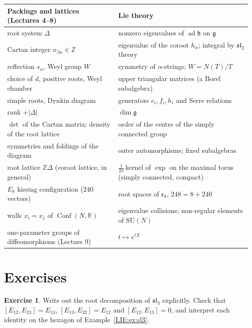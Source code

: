 \documentclass[11pt,openany]{book}
\theoremstyle{plain}
\theoremstyle{definition}
\newtheorem{exercise}[theorem]{Exercise}
\theoremstyle{remark}
\newcommand{\R}{\mathbb{R}}
\newcommand{\Z}{\mathbb{Z}}
\newcommand{\Conf}{\operatorname{Conf}}
\newcommand{\abs}[1]{\left\lvert #1 \right\rvert}
\begin{document}
\begin{center}
\renewcommand{\arraystretch}{1.25}
\begin{tabular}{p{}p{}}
\toprule
Packings and lattices (Lectures 4--8) & Lie theory\\
\midrule
root system $\Delta$ & nonzero eigenvalues of $\operatorname{ad}\mathfrak h$ on $\mathfrak g$\\
Cartan integer $n_{\beta\alpha}\in\Z$ & eigenvalue of the coroot $h_\alpha$; integral by $\mathfrak{sl}_2$ theory\\
reflection $s_\alpha$, Weyl group $W$ & symmetry of $\alpha$-strings; $W=N(T)/T$\\
choice of $d$, positive roots, Weyl chamber & upper triangular matrices (a Borel subalgebra)\\
simple roots, Dynkin diagram & generators $e_i,f_i,h_i$ and Serre relations\\
rank $+\abs{\Delta}$ & $\dim\mathfrak g$\\
$\det$ of the Cartan matrix; density of the root lattice & order of the centre of the simply connected group\\
symmetries and foldings of the diagram & outer automorphisms; fixed subalgebras\\
root lattice $\Z\Delta$ (coroot lattice, in general) & $\tfrac1{2\pi}\,$kernel of $\exp$ on the maximal torus (simply connected, compact)\\
$E_8$ kissing configuration ($240$ vectors) & root spaces of $\mathfrak e_8$, $248=8+240$\\
walls $x_i=x_j$ of $\Conf(N,\R)$ & eigenvalue collisions; non-regular elements of $\mathrm{SU}(N)$\\
one-parameter groups of diffeomorphisms (Lecture 9) & $t\mapsto e^{tX}$\\
\bottomrule
\end{tabular}
\end{center}

\section*{Exercises}

\begin{exercise}
Write out the root decomposition of $\mathfrak{sl}_3$ explicitly. Check that $[E_{12},E_{23}]=E_{13}$,
$[E_{13},E_{32}]=E_{12}$ and $[E_{12},E_{13}]=0$, and interpret each identity on the hexagon of
Example~\ref{LIE:ex:sl3}.
\end{exercise}
\end{document}
